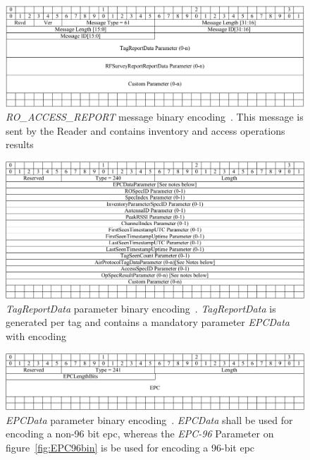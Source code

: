 \begin{figure}[]
    \centering
    \includegraphics[width=\textwidth]{./figs/02-state-of-the-art/RO_ACCESS_REPORT_bin.pdf}
    \caption[\textit{RO\_ACCESS\_REPORT} message binary encoding]{\textit{RO\_ACCESS\_REPORT} message binary encoding~\cite{LowLevelReader}. This message is sent by the Reader and contains inventory and access operations results} 
    \label{fig:ROACCESSREPORTbin}
\end{figure}

\begin{figure}[]
    \centering
    \includegraphics[width=\textwidth]{./figs/02-state-of-the-art/TagReportData_bin.pdf}
    \caption[\textit{TagReportData} parameter binary encoding]{\textit{TagReportData} parameter binary encoding~\cite{LowLevelReader}. \textit{TagReportData} is generated per tag and contains a mandatory parameter \textit{EPCData} with encoding} 
    \label{fig:TagReportDatabin}
\end{figure}

\begin{figure}[]
    \centering
    \includegraphics[width=\textwidth]{./figs/02-state-of-the-art/EPCDataParameter_bin.pdf}
    \caption[\textit{EPCData} parameter binary encoding]{\textit{EPCData} parameter binary encoding~\cite{LowLevelReader}. \textit{EPCData} shall be used for encoding a non-96 bit \ac{epc}, whereas the \textit{EPC-96} Parameter on figure~\ref{fig:EPC96bin} is be used for encoding a 96-bit \ac{epc}} 
    \label{fig:EPCDatabin}
\end{figure}

